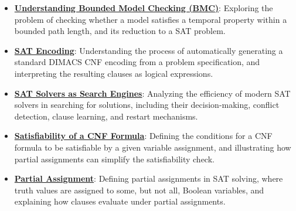 \documentclass{article}%
\begin{document}
\begin{itemize}[leftmargin=*]
\item \href{https://purdue.brightspace.com/d2l/common/assets/pdfjs-d2l-dist/1.0.14-legacy/web/viewer.html?file=\%2Fcontent\%2Fenforced\%2F1095467-wl.202510.CS.24300.001\%2F15L2-SAT.pdf\%3Fou\%3D1095467\&lang=en-us\&container=d2l-fileviewer-rendered-pdf\&fullscreen=d2l-fileviewer-rendered-pdf-dialog\&height=667#page=6}{\textbf{Understanding Bounded Model Checking (BMC)}}: Exploring the problem of checking whether a model satisfies a temporal property within a bounded path length, and its reduction to a SAT problem.%
\item \href{https://purdue.brightspace.com/d2l/common/assets/pdfjs-d2l-dist/1.0.14-legacy/web/viewer.html?file=\%2Fcontent\%2Fenforced\%2F1095467-wl.202510.CS.24300.001\%2F15L2-SAT.pdf\%3Fou\%3D1095467\&lang=en-us\&container=d2l-fileviewer-rendered-pdf\&fullscreen=d2l-fileviewer-rendered-pdf-dialog\&height=667#page=7}{\textbf{SAT Encoding}}: Understanding the process of automatically generating a standard DIMACS CNF encoding from a problem specification, and interpreting the resulting clauses as logical expressions.%
\item \href{https://purdue.brightspace.com/d2l/common/assets/pdfjs-d2l-dist/1.0.14-legacy/web/viewer.html?file=\%2Fcontent\%2Fenforced\%2F1095467-wl.202510.CS.24300.001\%2F15L2-SAT.pdf\%3Fou\%3D1095467\&lang=en-us\&container=d2l-fileviewer-rendered-pdf\&fullscreen=d2l-fileviewer-rendered-pdf-dialog\&height=667#page=11}{\textbf{SAT Solvers as Search Engines}}: Analyzing the efficiency of modern SAT solvers in searching for solutions, including their decision-making, conflict detection, clause learning, and restart mechanisms.%
\item \href{https://purdue.brightspace.com/d2l/common/assets/pdfjs-d2l-dist/1.0.14-legacy/web/viewer.html?file=\%2Fcontent\%2Fenforced\%2F1095467-wl.202510.CS.24300.001\%2F15L2-SAT.pdf\%3Fou\%3D1095467\&lang=en-us\&container=d2l-fileviewer-rendered-pdf\&fullscreen=d2l-fileviewer-rendered-pdf-dialog\&height=667#page=13}{\textbf{Satisfiability of a CNF Formula}}: Defining the conditions for a CNF formula to be satisfiable by a given variable assignment, and illustrating how partial assignments can simplify the satisfiability check.%
\item \href{https://purdue.brightspace.com/d2l/common/assets/pdfjs-d2l-dist/1.0.14-legacy/web/viewer.html?file=\%2Fcontent\%2Fenforced\%2F1095467-wl.202510.CS.24300.001\%2F15L2-SAT.pdf\%3Fou\%3D1095467\&lang=en-us\&container=d2l-fileviewer-rendered-pdf\&fullscreen=d2l-fileviewer-rendered-pdf-dialog\&height=667#page=14}{\textbf{Partial Assignment}}: Defining partial assignments in SAT solving, where truth values are assigned to some, but not all, Boolean variables, and explaining how clauses evaluate under partial assignments.%

\end{itemize}
\end{document}
